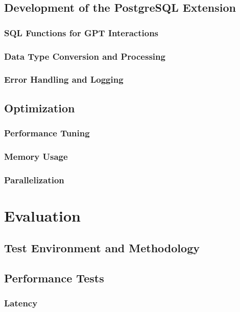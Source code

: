 \documentclass{article}
\begin{document}
\subsection{Development of the PostgreSQL Extension}
\subsubsection{SQL Functions for GPT Interactions}
\subsubsection{Data Type Conversion and Processing}
\subsubsection{Error Handling and Logging}

\subsection{Optimization}
\subsubsection{Performance Tuning}
\subsubsection{Memory Usage}
\subsubsection{Parallelization}

\newpage

\section{Evaluation}


\subsection{Test Environment and Methodology}

\subsection{Performance Tests}
\subsubsection{Latency}
\end{document}
